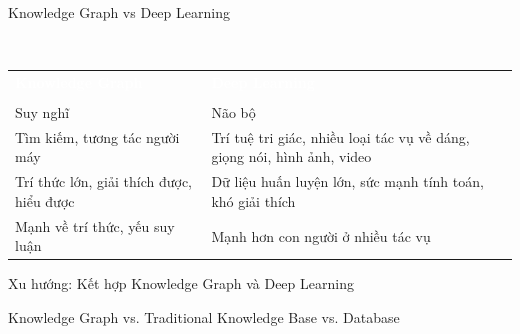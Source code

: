 \documentclass[notheorems, aspectratio=54]{beamer}
\begin{document}
	\begin{frame}{Knowledge Graph vs Deep Learning}
		\begin{block}{~\vspace{0.7cm}}
			\begin{center}
				\vspace{-0.8cm}
				\begin{tabular}{p{0.45\textwidth}|p{}}
					\textcolor{white}{\bf Knowledge Graph} & \textcolor{white}{\bf Deep Learning} \\\\
					Suy nghĩ & Não bộ\\
					Tìm kiếm, tương tác người máy & Trí tuệ tri giác, nhiều loại tác vụ về dáng, giọng nói, hình ảnh, video\\
					Trí thức lớn, giải thích được, hiểu được & Dữ liệu huấn luyện lớn, sức mạnh tính toán, khó giải thích\\
					Mạnh về trí thức, yếu suy luận & Mạnh hơn con người ở nhiều tác vụ\\
				\end{tabular}
			\end{center}
		\end{block}
	Xu hướng: Kết hợp Knowledge Graph và Deep Learning
	\end{frame}

	\begin{frame}{Knowledge Graph vs. Traditional Knowledge Base vs. Database}
		\begin{table}[htbp]
			\caption{Bảng so sánh}\label{tab1}
		\end{table}
	\end{frame}
	
\end{document}
